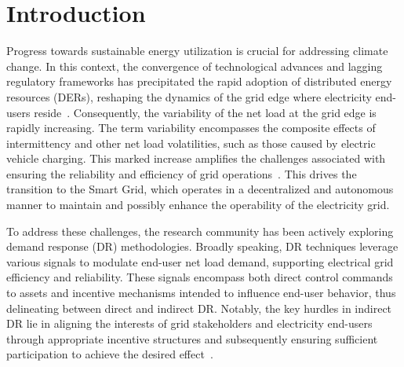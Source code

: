 \documentclass[preprint, 12pt]{elsarticle}
\begin{document}


\section{Introduction}\label{sec: Intoduction}

Progress towards sustainable energy utilization is crucial for addressing climate change. In this context, the convergence of technological advances and lagging regulatory frameworks has precipitated the rapid adoption of distributed energy resources (DERs), reshaping the dynamics of the grid edge where electricity end-users reside~\cite{IEA}. Consequently, the variability of the net load at the grid edge is rapidly increasing. The term variability encompasses the composite effects of intermittency and other net load volatilities, such as those caused by electric vehicle charging. This marked increase amplifies the challenges associated with ensuring the reliability and efficiency of grid operations~\cite{KOK_Landscape_Report, OConnell_Landscape_Report}. This drives the transition to the Smart Grid, which operates in a decentralized and autonomous manner to maintain and possibly enhance the operability of the electricity grid.

To address these challenges, the research community has been actively exploring demand response (DR) methodologies. Broadly speaking, DR techniques leverage various signals to modulate end-user net load demand, supporting electrical grid efficiency and reliability. These signals encompass both direct control commands to assets and incentive mechanisms intended to influence end-user behavior, thus delineating between direct and indirect DR. Notably, the key hurdles in indirect DR lie in aligning the interests of grid stakeholders and electricity end-users through appropriate incentive structures and subsequently ensuring sufficient participation to achieve the desired effect~\cite{CHEN2017, FedEnergyRegulatoryCommission_DRReport, Tushar_LEM_Review}. 
\end{document}
